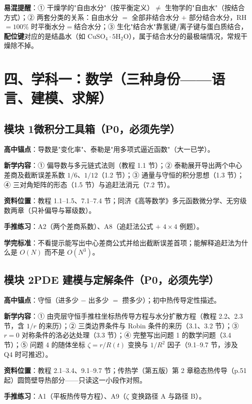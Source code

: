 \documentclass[12pt,a4paper]{ctexart}
\begin{document}
\textbf{易混提醒}：① 干燥学的"自由水分"（按平衡定义）$\ne$ 生物学的"自由水"（按结合方式）；② 两套分类的关系：自由水分 $=$ 全部非结合水分 $+$ 部分结合水分，RH$=100\%$ 时平衡水分$=$结合水分；③ 生化"结合水"靠氢键/离子键与蛋白质结合，\textbf{配位键}对应的是结晶水（如 $\mathrm{CuSO_4\cdot5H_2O}$），属于结合水分的最极端情况，常规干燥除不掉。

\section{四、学科一：数学（三种身份——语言、建模、求解）}

\subsection{模块 1\quad 微积分工具箱（P0，必须先学）}

\textbf{高中锚点}：导数是"变化率"、泰勒是"用多项式逼近函数"（大一已学）。

\textbf{新学内容}：① 偏导数与多元链式法则（教程 1.1 节）；② 泰勒展开导出两个中心差商及截断误差系数 $1/6$、$1/12$（1.2 节）；③ 通量与守恒的积分思想（1.3 节）；④ 三对角矩阵的形态（1.5 节）与追赶法消元（7.2 节）。

\textbf{资料位置}：教程 1.1--1.5、7.1--7.4 节；同济《高等数学》多元函数微分学、无穷级数两章（只补偏导与幂级数）。

\textbf{手推练习}：A2（两个差商系数）、A8（追赶法公式 $+$ $4\times4$ 例题）。

\textbf{学完标准}：不看提示能写出中心差商公式并给出截断误差首项；能解释追赶法为什么是 $O(N)$ 而不是 $O(N^3)$。

\subsection{模块 2\quad PDE 建模与定解条件（P0，必须先学）}

\textbf{高中锚点}：守恒（进多少 $-$ 出多少 $=$ 攒多少）；初中热传导定性描述。

\textbf{新学内容}：① 由壳层守恒手推柱坐标热传导方程与水分扩散方程（教程 2.2、2.3 节，含 $1/r$ 的来历）；② 三类边界条件与 Robin 条件的来历（3.1、3.2 节）；③ $r=0$ 对称条件的洛必达处理（3.3 节）；④ 完整写出问题 1 的数学问题（3.4 节）；⑤ 问题 4 的随体坐标 $\zeta=r/R(t)$ 变换与 $1/R^2$ 因子（9.1--9.7 节，涉及 Q4 时可推迟）。

\textbf{资料位置}：教程 2.1--3.4、9.1--9.7 节；传热学（第五版）第 2 章稳态热传导（p.51 起）圆筒壁导热部分——只读这一小段作对照。

\textbf{手推练习}：A1（平板热传导方程）、A9（$\zeta$ 变换路径 A 与路径 B）。
\end{document}
